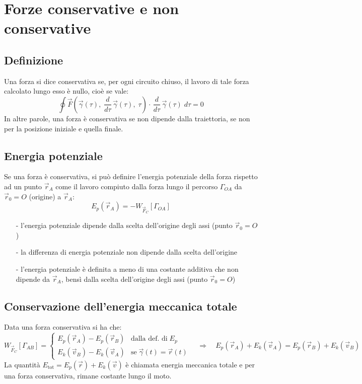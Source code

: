 \documentclass[a4paper]{article}
\newcommand\ftau{\vec{F}\left(\vec{\gamma}(\tau), \; \dtau \vec{\gamma}(\tau), \; \tau\right)}
\newcommand\dtau{\frac{d}{d\tau}\,}
\begin{document}
\section{Forze conservative e non conservative}
\subsection{Definizione}
Una forza si dice conservativa se, per ogni circuito chiuso, il lavoro di tale forza calcolato lungo esso è nullo, cioè se vale:
\[\oint \ftau \cdot \, \dtau \vec{\gamma}(\tau) \; d\tau = 0\]
In altre parole, una forza è conservativa se non dipende dalla traiettoria, se non per la posizione iniziale e quella finale.


\subsection{Energia potenziale}
Se una forza è conservativa, si può definire l'energia potenziale della forza rispetto ad un punto \(\vec{r}_A\) come il lavoro
compiuto dalla forza lungo il percorso \(\Gamma_{OA}\) da \(\vec{r}_0 = O\) (origine) a \(\vec{r}_A\):
\[E_p(\vec{r}_A) = - W_{\vec{F}_C}[\Gamma_{OA}]\]
\begin{itemize}[topsep=3pt, itemsep=0pt]
	\item[-] l'energia potenziale dipende dalla scelta dell'origine degli assi (punto \(\vec{r}_0 = O\))
	\item[-] la differenza di energia potenziale non dipende dalla scelta dell'origine
	\item[-] l'energia potenziale è definita a meno di una costante additiva che non dipende da \(\vec{r}_A\), bensì dalla scelta
	dell'origine degli assi (punto \(\vec{r}_0 = O\))
\end{itemize}

\subsection{Conservazione dell'energia meccanica totale}
Data una forza conservativa si ha che:
\[W_{\vec{F}_C}[\Gamma_{AB}] = \begin{cases}
	E_p(\vec{r}_A) - E_p(\vec{r}_B) &\text{dalla def. di} \; E_p \\
	E_k(\vec{v}_B) - E_k(\vec{v}_A) &\text{se} \; \vec{\gamma}(t) = \vec{r}(t)
\end{cases} \quad \Rightarrow \quad E_p(\vec{r}_A) + E_k(\vec{v}_A) = E_p(\vec{r}_B) + E_k(\vec{v}_B)\]
La quantità \(E_\text{tot} = E_p(\vec{r}) + E_k(\vec{v})\) è chiamata energia meccanica totale e per una forza conservativa, rimane
costante lungo il moto.
\end{document}
